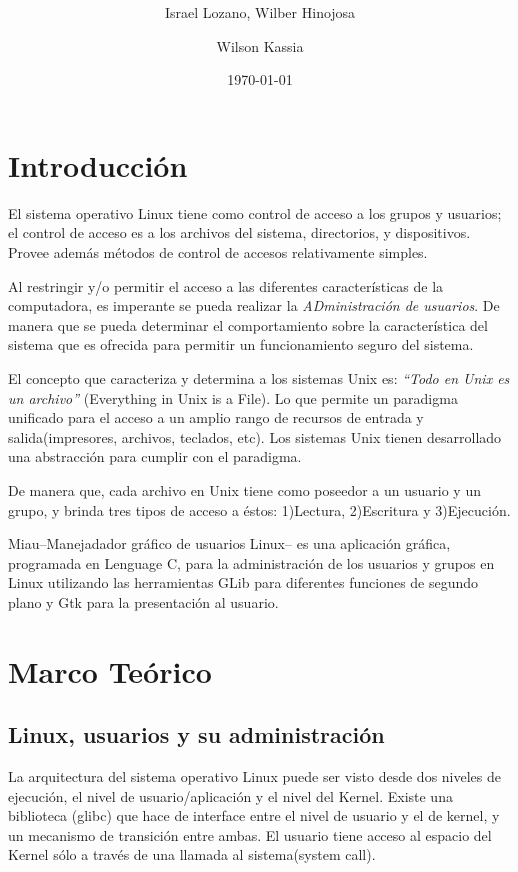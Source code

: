 \documentclass[letterpaper,10pt]{article}
\title{\swname \\ \swsub}
\date{\today}
\author{Israel Lozano, Wilber Hinojosa \and Wilson Kassia}
\newcommand{\swname}{Miau}
\newcommand{\swsub}{Manejadador gráfico de usuarios Linux}
\begin{document}
\maketitle

\section{Introducción}
El sistema operativo Linux tiene como control de acceso a los grupos y usuarios; el control de acceso es a los archivos del sistema, directorios,
y dispositivos. Provee además métodos de control de accesos relativamente simples.

Al restringir  y/o permitir el acceso a las diferentes características 
de la computadora, es imperante se pueda realizar la \emph{ADministración de usuarios}.
De manera que se pueda determinar el comportamiento sobre la característica
del sistema que es ofrecida para permitir un funcionamiento seguro del sistema.

El concepto que caracteriza y determina a los sistemas Unix es: \emph{``Todo en Unix es un archivo''}
(Everything in Unix is a File). Lo que permite un paradigma unificado para el acceso
a un amplio rango de recursos de entrada y salida(impresores, archivos, teclados, etc).
Los sistemas Unix tienen desarrollado una abstracción para cumplir con el paradigma.

De manera que, cada archivo en Unix tiene como poseedor a un usuario y un grupo, y brinda 
tres tipos de acceso a éstos: 1)Lectura, 2)Escritura y 3)Ejecución.

\swname --\swsub-- es una aplicación gráfica, programada en Lenguage C, para la administración de los usuarios y grupos
en Linux utilizando las herramientas GLib para diferentes funciones de segundo plano y Gtk para
la presentación al usuario.

\section{Marco Teórico}
\subsection{Linux, usuarios y su administración }
La arquitectura del sistema operativo Linux puede ser visto desde dos niveles de ejecución, el nivel de usuario/aplicación
y el nivel del Kernel.
Existe una biblioteca (glibc) que hace de interface entre el nivel de usuario y el de kernel, y un mecanismo de transición 
entre ambas.
El usuario tiene acceso al espacio del Kernel sólo a través de una llamada al sistema(system call).
\end{document}
